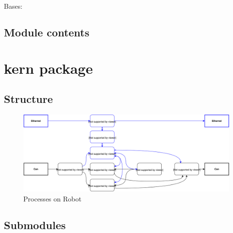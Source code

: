\documentclass[letterpaper,10pt,english]{sphinxmanual}
\begin{document}

\begin{fulllineitems}
\label{gui:gui.gui.CreateGroupBox}
Bases: 

\end{fulllineitems}


\begin{fulllineitems}
\label{gui:gui.gui.main}
\end{fulllineitems}



\section{Module contents}
\label{gui:module-contents}\label{gui:module-gui}

\chapter{kern package}
\label{kern::doc}\label{kern:kern-package}

\section{Structure}
\label{kern:structure}\begin{figure}[htbp]
\centering
\capstart

\includegraphics{kern_threads_1.svg}
\caption{Processes on Robot}\end{figure}


\section{Submodules}
\label{kern:submodules}
\end{document}
